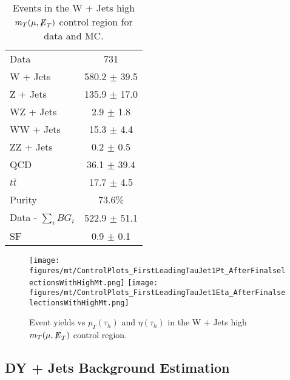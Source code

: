 \begin{table}[htbp!] 
\begin{center}
 \caption{ Events in the W + Jets high $m_{T}(\mu,{\not\mathrel{E}}_T)$ control region for data and MC.}
 \begin{tabular}{| l | c |}
 \hline\hline
Data & 731 \\
W + Jets & 580.2 $\pm$ 39.5 \\
Z + Jets & 135.9 $\pm$ 17.0 \\
WZ + Jets & 2.9 $\pm$ 1.8 \\
WW + Jets & 15.3 $\pm$ 4.4 \\
ZZ + Jets & 0.2 $\pm$ 0.5 \\
QCD & 36.1 $\pm$ 39.4 \\
$t\bar{t}$ & 17.7 $\pm$ 4.5 \\ \hline
Purity & 73.6\% \\
Data - $\sum\limits_{i} BG_{i}$ & 522.9 $\pm$ 51.1 \\ \hline
SF & 0.9 $\pm$ 0.1 \\
 \hline
 \hline
 \end{tabular}
 \label{tab:muTauHighMt}
\end{center}
\end{table}

\begin{figure}[thbp!]\centering 
  \texttt{[image: figures/mt/ControlPlots\_FirstLeadingTauJet1Pt\_AfterFinalselectionsWithHighMt.png]}
  \texttt{[image: figures/mt/ControlPlots\_FirstLeadingTauJet1Eta\_AfterFinalselectionsWithHighMt.png]} 
  \caption{\label{fig:muTauHighMtControlPlots} Event yields vs $p_{T}(\tau_{h})$ and $\eta(\tau_{h})$ in the W + Jets high $m_{T}(\mu,{\not\mathrel{E}}_T)$ control region.}
\end{figure}

\subsection{DY + Jets Background Estimation}

